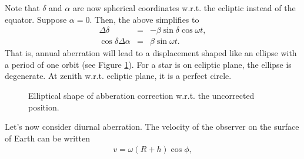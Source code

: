 \documentclass [12pt, a4paper] {article}
\begin{document}
Note that $\delta$ and $\alpha$ are now spherical coordinates w.r.t. the ecliptic
instead of the equator. Suppose $\alpha=0$. Then, the above simplifies to 
\begin {eqnarray}
    \Delta\delta &=& 
    -\beta \sin\delta\cos\omega t,
    \\
    \cos\delta\Delta\alpha &=& 
    \beta\sin\omega t.
\end {eqnarray}
That is, annual aberration will lead to a displacement shaped like an ellipse
with a period of one orbit (see Figure \ref{fig:aberration_ellipse}). For a star 
is on ecliptic plane, the ellipse is degenerate. At zenith w.r.t. ecliptic plane, 
it is a perfect circle.

\begin {figure}[t]
  \begin {center}
    \caption{\label{fig:aberration_ellipse}Elliptical shape of abberation correction w.r.t.
            the uncorrected position.}
  \end {center}
\end {figure}
Let's now consider diurnal aberration.
The velocity of the observer on the surface of Earth can be written
\begin {eqnarray}
    v = \omega(R + h)\cos\phi,
\end {eqnarray}
\end{document}

